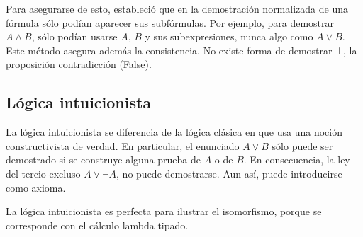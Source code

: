 \documentclass[paper=a4, fontsize=11pt, spanish]{scrartcl} %
\numberwithin{equation}{section} %
\numberwithin{figure}{section} %
\numberwithin{table}{section} %
\begin{document}
    Para asegurarse de esto, estableció que en la demostración normalizada de una
    fórmula sólo podían aparecer sus subfórmulas. Por ejemplo, para demostrar $A \wedge B$,
    sólo podían usarse $A$, $B$ y sus subexpresiones, nunca algo como $A \vee B$.
    Este método asegura además la consistencia. No existe forma de demostrar $\bot$,
    la proposición contradicción (False).
  
    \subsection{Lógica intuicionista}
      La lógica intuicionista se diferencia de la lógica clásica en que usa una noción
      constructivista de verdad. En particular, el enunciado $A \vee B$ sólo puede ser
      demostrado si se construye alguna prueba de $A$ o de $B$. En consecuencia, la
      ley del tercio excluso $A \vee \neg A$, no puede demostrarse. Aun así,
      puede introducirse como axioma.
      
      La lógica intuicionista es perfecta para ilustrar el isomorfismo, porque
      se corresponde con el cálculo lambda tipado.\\
      
\end{document}

